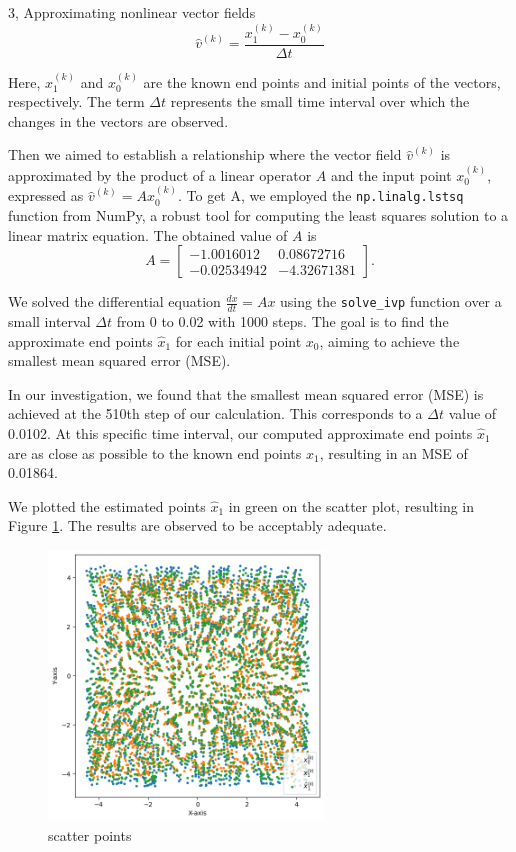 \begin{task}{3, Approximating nonlinear vector fields}
\begin{equation}
\hat{v}^{(k)} = \frac{x^{(k)}_1 - x^{(k)}_0}{\Delta t}
\label{vec}
\end{equation}

Here, \(x^{(k)}_1\) and \(x^{(k)}_0\) are the known end points and initial points of the vectors, respectively. The term \(\Delta t\) represents the small time interval over which the changes in the vectors are observed.

Then we aimed to establish a relationship where the vector field 
\( \hat{v}^{(k)} \) is approximated by the product of a linear operator \( A \) and the input point \( x^{(k)}_0 \), 
expressed as \(\hat{v}^{(k)} = Ax^{(k)}_0 \). To get A, we employed the \texttt{np.linalg.lstsq} function from 
NumPy, a robust tool for computing the least squares solution to a linear matrix equation. The obtained value of \( A \) is 
\[
A =  \begin{bmatrix}
-1.0016012 & 0.08672716 \\
-0.02534942 & -4.32671381
\end{bmatrix}.
\]

We solved the differential equation \(\frac{dx}{dt} = Ax\) using the \texttt{solve\_ivp} function over a small interval \(\Delta t\) from 0 to 0.02 with 1000 steps. The goal is to find the approximate end points \(\hat{x}_1\) for each initial point \(x_0\), aiming to achieve the smallest mean squared error (MSE).

In our investigation, we found that the smallest mean squared error (MSE) is achieved at the 510th step of our calculation. This corresponds to a \(\Delta t\) value of 0.0102. At this specific time interval, our computed approximate end points \(\hat{x}_1\) are as close as possible to the known end points \(x_1\), resulting in an MSE of 0.01864.

We plotted the estimated points \( \hat{x}_1 \) in green on the scatter plot, resulting in Figure \ref{fig:3.2}. The results are observed to be acceptably adequate.


\begin{figure}[H]
\centering
\includegraphics[width=0.65\textwidth]{images/nonlinear_vector_fields2.png}
\caption{scatter points}
\label{fig:3.2}
\end{figure}





\end{task}
